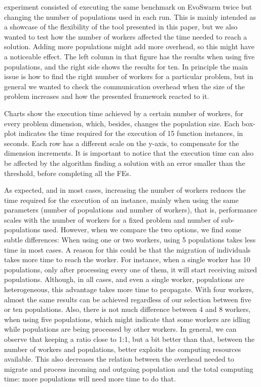 \documentclass[review]{elsarticle}
\begin{document}
experiment consisted of executing the same benchmark on EvoSwarm twice but
changing the number of populations used in each run. This is mainly
intended as a showcase of the flexibility of the tool presented in
this paper, but we also wanted to test how the number of workers
affected the time needed to reach a solution. Adding more populations
might add more overhead, so this might have a noticeable effect.
The left column in that figure has the
results when using five populations, and the right side shows the results for
ten. In principle the main issue is how to find the right number of
workers for a particular problem, but in general we wanted to check
the communication overhead when the size of the problem increases and
how the presented framework reacted to it. %

Charts show the execution time achieved by a certain number of
workers, for every problem dimension, which, besides, changes the
population size.
Each box-plot indicates the time required for the execution of 15 function
instances, in seconds.  Each row has a different scale on the y-axis, to
compensate for the dimension increments. It is important to notice that the
execution time can also be affected by the algorithm finding a solution with an
error smaller than the threshold, before completing all the FEs.

As expected, and in most cases, increasing the number of workers reduces the time
required for the execution of an instance, mainly when using the same parameters
(number of populations and number of workers), that is, performance
scales with the number of workers for a fixed problem and number of
sub-populations used. However, when we compare the two
options, we find some subtle differences: When using one or two
workers, using 5 populations takes less time in most cases. A 
reason for this could be that the migration of individuals takes more time to
reach the worker. For instance, when a single worker has 10 populations, only
after processing every one of them, it will start receiving mixed populations.  Although, in
all cases, and even a single worker, populations are heterogeneous, this
advantage takes more time to propagate. With four workers, almost the same
results can be achieved regardless of our selection between five or ten
populations. Also, there is not much difference between 4 and 8 workers, when
using five populations, which might indicate that some workers are
idling while populations are being processed by other workers. In
general, we can observe that keeping a ratio close to 1:1, but a bit
better than that, between the number of workers and populations, better exploits the computing
resources available. This also decreases the relation between the
overhead needed to migrate and process incoming and outgoing
population and the total computing time: more populations will need
more time to do that.
\end{document}
